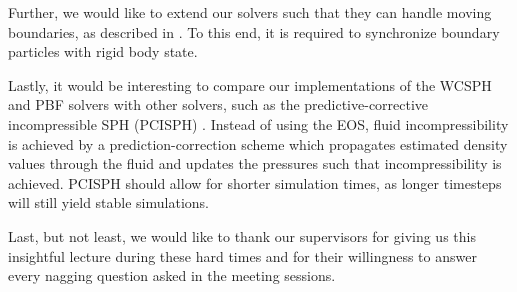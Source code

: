 \documentclass[11pt, letterpaper, twocolumn]{article}
\begin{document}
Further, we would like to extend our solvers such that they can handle moving boundaries, as described in \cite{akinci2012}. To this end, it is required to synchronize boundary particles with rigid body state.

Lastly, it would be interesting to compare our implementations of the WCSPH and PBF solvers with other solvers, such as the predictive-corrective incompressible SPH (PCISPH) \cite{solenthaler09}. Instead of using the EOS, fluid incompressibility is achieved by a prediction-correction scheme which propagates estimated density values
through the fluid and updates the pressures such that incompressibility is achieved. PCISPH should allow for shorter simulation times, as longer timesteps will still yield stable simulations.

Last, but not least, we would like to thank our supervisors for giving us this insightful lecture during these hard times and for their willingness to answer every nagging question asked in the meeting sessions. 




{\footnotesize
}



\end{document}
